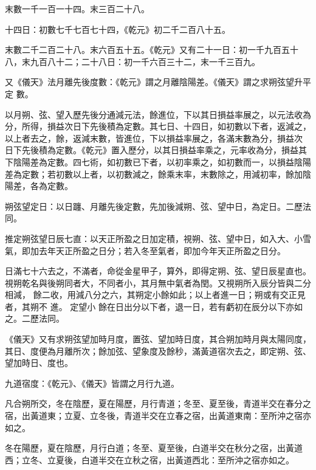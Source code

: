 \begin{pinyinscope}
 末數一千一百一十四。末三百二十八。



 十四日：初數七千七百七十四，《乾元》初二千二百八十五。



 末數二千二百二十八。末六百五十五。《乾元》又有二十一日：初一千九百五十八，末九百八十二；二十八日：初一千六百三十二，末一千三百九。



 又《儀天》法月離先後度數：《乾元》謂之月離陰陽差。《儀天》謂之求朔弦望升平定
 數。



 以月朔、弦、望入歷先後分通減元法，餘進位，下以其日損益率展之，以元法收為分，所得，損益次日下先後積為定數。其七日、十四日，如初數以下者，返減之，以上者去之，餘，返減末數，皆進位，下以損益率展之，各滿末數為分，損益次
 日下先後積為定數。《乾元》置入歷分，以其日損益率乘之，元率收為分，損益其下陰陽差為定數。四七術，如初數已下者，以初率乘之，如初數而一，以損益陰陽差為定數；若初數以上者，以初數減之，餘乘末率，末數除之，用減初率，餘加陰陽差，各為定數。



 朔弦望定日：以日躔、月離先後定數，先加後減朔、弦、望中日，為定日。二歷法同。



 推定朔弦望日辰七直：以天正所盈之日加定積，視朔、弦、望中日，如入大、小雪氣，即加去年天正所盈之日分；若入冬至氣者，即加今年天正所盈之日分。



 日滿七十六去之，不滿者，命從金星甲子，算外，即得定朔、弦、望日辰星直也。視朔乾名與後朔同者大，不同者小，其月無中氣者為閏。又視朔所入辰分皆與二分相減，
 餘二收，用減八分之六，其朔定小餘如此；以上者進一日；朔或有交正見者，其朔不
 進。
 定望小
 餘在日出分以下者，退一日，若有虧初在辰分以下亦如之。二歷法同。



 《儀天》又有求朔弦望加時月度，置弦、望加時日度，其合朔加時月與太陽同度，其日、度便為月離所次；餘加弦、望象度及餘秒，滿黃道宿次去之，即定朔、弦、望加時日、度也。



 九道宿度：《乾元》、《儀天》皆謂之月行九道。



 凡合朔所交，冬在陰歷，夏在陽歷，月行青道；冬至、夏至後，青道半交在春分之宿，出黃道東；立夏、立冬後，青道半交在立春之宿，出黃道東南：至所沖之宿亦如之。



 冬在陽歷，夏在陰歷，月行白道；冬至、夏至後，白道半交在秋分之宿，出黃道西；立冬、立夏後，白道半交在立秋之宿，出黃道西北：至所沖之宿亦如之。




\end{pinyinscope}
